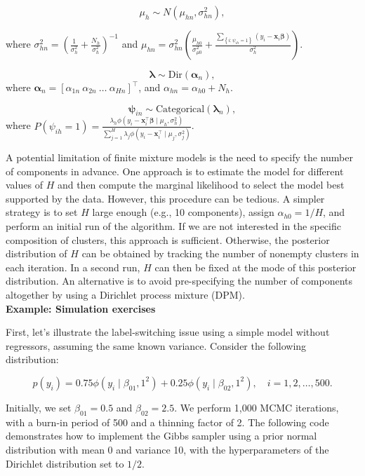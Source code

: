 $$\mu_h\sim N(\mu_{hn},\sigma_{hn}^2),$$

where $\sigma_{hn}^2=\left(\frac{1}{\sigma_{h}^{2}}+\frac{N_h}{\sigma_{h}^2}\right)^{-1}$ and $\mu_{hn}=\sigma_{hn}^2\left(\frac{\mu_{h0}}{\sigma_{\mu0}^2}+\frac{\sum_{\left\{i:\psi_{ih}=1\right\}} (y_i-\bm{x}_i\bm{\beta})}{\sigma_h^2}\right)$.

$$\bm{\lambda}\sim \text{Dir}(\bm{\alpha}_n),$$   
where $\bm{\alpha}_n=[\alpha_{1n} \  \alpha_{2n} \ \dots \ \alpha_{Hn}]^{\top}$, and $\alpha_{hn}=\alpha_{h0}+N_h$.

$$\bm{\psi}_{in}\sim \text{Categorical}(\bm{\lambda}_n),$$
where $P(\psi_{ih}=1)=\frac{\lambda_{h}\phi(y_i-\bm{x}_i^{\top}\bm{\beta} \mid \mu_h,\sigma_h^2)}{\sum_{j=1}^H\lambda_{j}\phi(y_i-\bm{x}_i^{\top} \mid \mu_j,\sigma_j^2)}$.
 
A potential limitation of finite mixture models is the need to specify the number of components in advance. One approach is to estimate the model for different values of $H$ and then compute the marginal likelihood to select the model best supported by the data. However, this procedure can be tedious. A simpler strategy is to set $H$ large enough (e.g., 10 components), assign $\alpha_{h0} = 1/H$, and perform an initial run of the algorithm. If we are not interested in the specific composition of clusters, this approach is sufficient. Otherwise, the posterior distribution of $H$ can be obtained by tracking the number of nonempty clusters in each iteration. In a second run, $H$ can then be fixed at the mode of this posterior distribution. An alternative is to avoid pre-specifying the number of components altogether by using a Dirichlet process mixture (DPM).\\

\textbf{Example: Simulation exercises}

First, let’s illustrate the label-switching issue using a simple model without regressors, assuming the same known variance. Consider the following distribution:  

$$p(y_i) = 0.75 \phi(y_i \mid \beta_{01},1^2) + 0.25 \phi(y_i \mid \beta_{02},1^2), \quad i = 1,2,\dots,500.$$

Initially, we set $\beta_{01} = 0.5$ and $\beta_{02} = 2.5$. We perform 1,000 MCMC iterations, with a burn-in period of 500 and a thinning factor of 2. The following code demonstrates how to implement the Gibbs sampler using a prior normal distribution with mean 0 and variance 10, with the hyperparameters of the Dirichlet distribution set to $1/2$.

